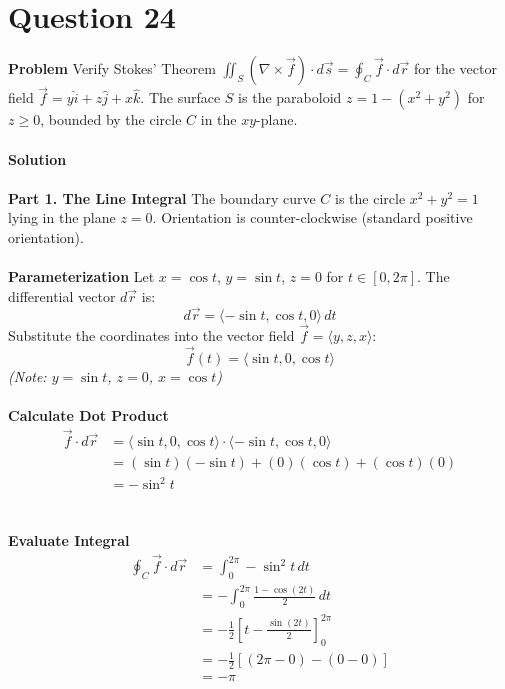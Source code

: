 \documentclass{article}
\begin{document}
\section{Question 24}
\textbf{Problem}
Verify Stokes' Theorem
$\iint_S (\nabla \times \vec{f}) \cdot d\vec{s} = \oint_C \vec{f} \cdot d\vec{r}$
for the vector field $\vec{f} = y\hat{i} + z\hat{j} + x\hat{k}$. The surface $S$
is the paraboloid $z = 1 - (x^2 + y^2)$ for $z \ge 0$, bounded by the circle $C$
in the $xy$-plane.
\\
\\
\textbf{Solution}
\\
\\
\textbf{Part 1. The Line Integral}
The boundary curve $C$ is the circle $x^2 + y^2 = 1$ lying in the plane $z=0$.
Orientation is counter-clockwise (standard positive orientation).
\\
\\
\textbf{Parameterization}
Let $x = \cos t$, $y = \sin t$, $z = 0$ for $t \in [0, 2\pi]$.
The differential vector $d\vec{r}$ is:
\[
	d\vec{r} = \langle -\sin t, \cos t, 0 \rangle \, dt
\]
Substitute the coordinates into the vector field $\vec{f} = \langle y, z, x \rangle$:
\[
	\vec{f}(t) = \langle \sin t, 0, \cos t \rangle
\]
\textit{(Note: $y=\sin t$, $z=0$, $x=\cos t$)}
\\
\\
\textbf{Calculate Dot Product}
\begin{align*}
	\vec{f} \cdot d\vec{r} & = \langle \sin t, 0, \cos t \rangle \cdot \langle -\sin t, \cos t, 0 \rangle \\
	                       & = (\sin t)(-\sin t) + (0)(\cos t) + (\cos t)(0)                              \\
	                       & = -\sin^2 t
\end{align*}
\\
\\
\textbf{Evaluate Integral}
\begin{align*}
	\oint_C \vec{f} \cdot d\vec{r} & = \int_0^{2\pi} -\sin^2 t \, dt                               \\
	                               & = -\int_0^{2\pi} \frac{1 - \cos(2t)}{2} \, dt                 \\
	                               & = -\frac{1}{2} \left[ t - \frac{\sin(2t)}{2} \right]_0^{2\pi} \\
	                               & = -\frac{1}{2} [ (2\pi - 0) - (0 - 0) ]                       \\
	                               & = -\pi
\end{align*}
\end{document}
